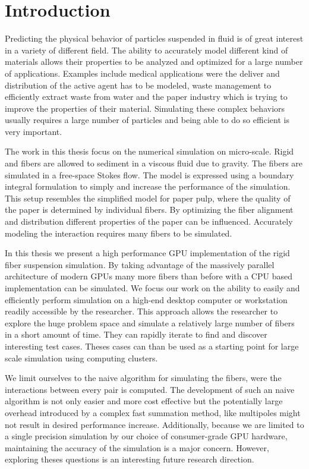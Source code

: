 \documentclass[a4paper,11pt]{kth-mag}
\begin{document}
\chapter{Introduction}

Predicting the physical behavior of particles suspended in fluid is of great interest in a variety of different field. The ability to accurately model different kind of materials allows their properties to be analyzed and optimized for a large number of applications. Examples include medical applications were the deliver and distribution of the active agent has to be modeled, waste management to efficiently extract waste from water and the paper industry which is trying to improve the properties of their material. Simulating these complex behaviors usually requires a large number of particles and being able to do so efficient is very important.

The work in this thesis focus on the numerical simulation on micro-scale. Rigid and fibers are allowed to sediment in a viscous fluid due to gravity. The fibers are simulated in a free-space Stokes flow. The model is expressed using a boundary integral formulation to simply and increase the performance of the simulation. This setup resembles the simplified model for paper pulp, where the quality of the paper is determined by individual fibers. By optimizing the fiber alignment and distribution different properties of the paper can be influenced. Accurately modeling the interaction requires many fibers to be simulated.

In this thesis we present a high performance GPU implementation of the rigid fiber suspension simulation. By taking advantage of the massively parallel architecture of modern GPUs many more fibers than before with a CPU based implementation can be simulated. We focus our work on the ability to easily and efficiently perform simulation on a high-end desktop computer or workstation readily accessible by the researcher. This approach allows the researcher to explore the huge problem space and simulate a relatively large number of fibers in a short amount of time. They can rapidly iterate to find and discover interesting test cases. Theses cases can than be used as a starting point for large scale simulation using computing clusters.

We limit ourselves to the naive algorithm for simulating the fibers, were the interactions between every pair is computed. The development of such an naive algorithm is not only easier and more cost effective but the potentially large overhead introduced by a complex fast summation method, like multipoles might not result in desired performance increase. Additionally, because we are limited to a single precision simulation by our choice of consumer-grade GPU hardware, maintaining the accuracy of the simulation is a major concern. However, exploring theses questions is an interesting future research direction.
\end{document}
